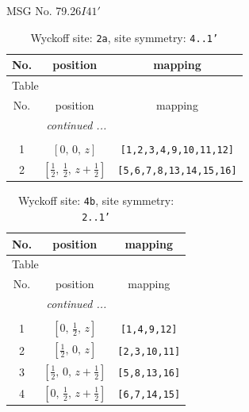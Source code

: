 \documentclass[fleqn,8pt]{jsarticle}
\begin{document}
\setcounter{MaxMatrixCols}{32}

\renewcommand{\tablename}{Table~}
\renewcommand{\figurename}{Figure~}
\begin{center}
\LARGE
MSG No. 79.26\quad$I41'$
\end{center}
\renewcommand{\arraystretch}{1.2}
\begin{longtable}{ccc}
\caption{Wyckoff site: {\tt 2a}, site symmetry: {\tt 4..1'}}
 \\
 \hline \hline
No. & position & mapping \\ \hline \endfirsthead

\multicolumn{2}{l}{\tablename\ \thetable{}} \\
 \hline \hline
No. & position & mapping \\ \hline \endhead

 \hline \hline
\multicolumn{2}{r}{\footnotesize\it continued ...} \\ \endfoot

 \hline \hline
\multicolumn{2}{r}{} \\ \endlastfoot

1 & $\left[ 0,\, 0,\, z \right]$ & {\tt [1,2,3,4,9,10,11,12]} \\ \hline
2 & $\left[ \frac{1}{2},\, \frac{1}{2},\, z + \frac{1}{2} \right]$ & {\tt [5,6,7,8,13,14,15,16]} \\
\end{longtable}
\renewcommand{\arraystretch}{1.2}
\begin{longtable}{ccc}
\caption{Wyckoff site: {\tt 4b}, site symmetry: {\tt 2..1'}}
 \\
 \hline \hline
No. & position & mapping \\ \hline \endfirsthead

\multicolumn{2}{l}{\tablename\ \thetable{}} \\
 \hline \hline
No. & position & mapping \\ \hline \endhead

 \hline \hline
\multicolumn{2}{r}{\footnotesize\it continued ...} \\ \endfoot

 \hline \hline
\multicolumn{2}{r}{} \\ \endlastfoot

1 & $\left[ 0,\, \frac{1}{2},\, z \right]$ & {\tt [1,4,9,12]} \\ \hline
2 & $\left[ \frac{1}{2},\, 0,\, z \right]$ & {\tt [2,3,10,11]} \\ \hline
3 & $\left[ \frac{1}{2},\, 0,\, z + \frac{1}{2} \right]$ & {\tt [5,8,13,16]} \\ \hline
4 & $\left[ 0,\, \frac{1}{2},\, z + \frac{1}{2} \right]$ & {\tt [6,7,14,15]} \\
\end{longtable}
\end{document}
